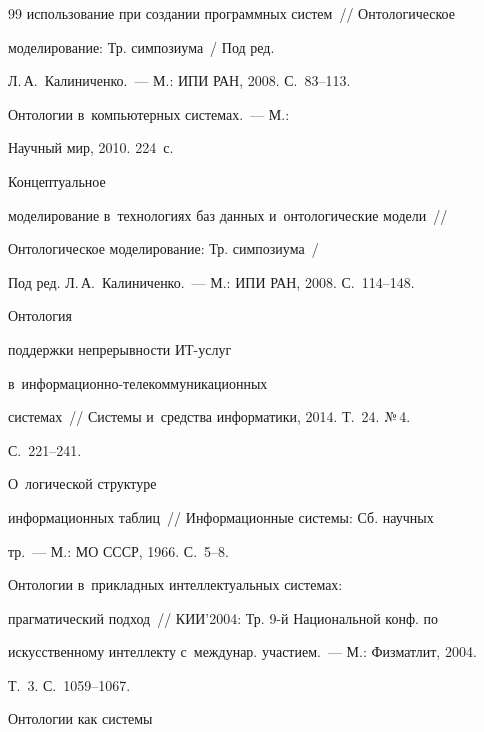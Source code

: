 {{\begin{thebibliography}{99}
использование при создании программных систем~/\!\!/ Онтологическое 


моделирование: Тр. симпозиума~/ Под ред. 


Л.\,А.~Калиниченко.~--- М.: ИПИ РАН, 2008. С.~83--113.







   Онтологии в~компьютерных системах.~--- М.: 


Научный мир, 2010. 224~с.




   Концептуальное 


моделирование в~технологиях баз данных и~онтологические модели~/\!\!/ 


Онтологическое моделирование: Тр. симпозиума~/ 


Под ред. Л.\,А.~Калиниченко.~--- М.: ИПИ РАН, 2008. С.~114--148.




   Онтология 


поддержки непрерывности ИТ-услуг 


  в~ин\-фор\-ма\-ци\-он\-но-те\-ле\-ком\-му\-ни\-ка\-ци\-он\-ных  


сис\-те\-мах~/\!\!/ Системы и~средства информатики, 2014. Т.~24. №\,4. 


С.~221--241.




   О~логической структуре 


информационных таб\-лиц~/\!\!/ Информационные системы: Сб. научных 


тр.~--- М.: МО СССР, 1966. С.~5--8.







   Онтологии в~прикладных интеллектуальных системах: 


прагматический подход~/\!\!/ КИИ'2004: Тр. 9-й Национальной конф. по 


искусственному интеллекту с~междунар. участием.~--- М.: Физматлит, 2004. 


Т.~3. С.~1059--1067.




   Онтологии как системы 



\end{thebibliography}}}
